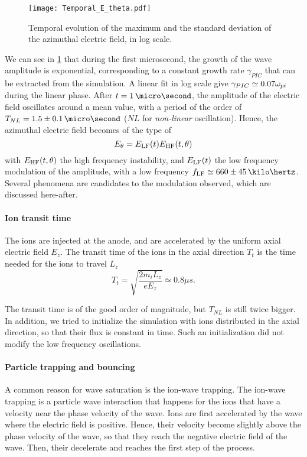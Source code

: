     \begin{figure}[!hbt]
      \centering
      \texttt{[image: Temporal\_E\_theta.pdf]}
      \caption{Temporal evolution of the maximum and the standard deviation of the azimuthal electric field, in log scale.}
      \label{fig-Ezstd_time}
    \end{figure}
    
    We can see in \cref{fig-Ezstd_time} that during the first microsecond, the growth of the wave amplitude is exponential, corresponding to a constant growth rate $\gamma_{PIC}$ that can be extracted from the simulation.
    A linear fit in log scale give $\gamma_{PIC} \simeq 0.07 \omega_{pi}$ during the linear phase.
    After $t=1\,\micro\second$, the amplitude of the electric field oscillates around a mean value, with a period of the order of $T_{NL}=1.5 \pm 0.1 \,\micro\second$ ($NL$ for {\it non-linear} oscillation).
    Hence, the azimuthal electric field becomes of the type of
    \[  E_{\theta} = E_{\rm LF}(t) E_{\rm HF}(t, {\theta}) \]
    with $E_{\rm HF}(t, \theta) $ the high frequency instability, and $E_{\rm LF}(t)$ the low frequency modulation of the amplitude, with a low frequency $f_{\rm LF} \simeq  660 \pm 45 \,\kilo\hertz$.
    Several phenomena are candidates to the modulation observed, which are discussed here-after.
    
  
  \paragraph{Ion transit time\\}
    The ions are injected at the anode, and are accelerated by the uniform axial electric field $E_z$.
    The transit time of the ions in the axial direction $T_t$  is the time needed for the ions to travel $L_z$
    \begin{equation} \label{eq-transittime}
      T_{t} = \sqrt{\frac{2 m_i L_z}{e E_z}} \simeq 0.8 \mu s.
    \end{equation}
    
    The transit time is of the good  order of magnitude, but $T_{NL}$ is still twice bigger.
    In addition, we tried to initialize the simulation with ions distributed in the axial direction, so that their flux is constant in time.
    Such an initialization did not modify the low frequency oscillations.
    
  \paragraph{Particle trapping and bouncing\\}
    A common reason for wave saturation is the ion-wave trapping.
    The ion-wave trapping is a particle wave interaction that happens for the ions that have a velocity near the phase velocity of the wave.
    Ions are first accelerated by the wave where the electric field is positive.
    Hence, their velocity become slightly above the phase velocity of the wave, so that they reach the negative electric field of the wave.
    Then, their decelerate and reaches the first step of the process. 
    
